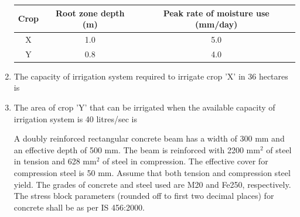 \documentclass[journal,12pt,onecolumn]{IEEEtran}
\theoremstyle{remark}
\begin{document}
\begin{enumerate}
\begin{table}[H]
\centering
\begin{tabular}{|c|c|c|}
\hline
Crop & Root zone depth (m) & Peak rate of moisture use (mm/day) \\
\hline
X & 1.0 & 5.0 \\
Y & 0.8 & 4.0 \\
\hline
\end{tabular}
\label{table5}
\end{table}
\noindent\item The capacity of irrigation system required to irrigate crop 'X' in 36 hectares is

\setlength{\parskip}{0.5cm}

\hfill{}
\begin{enumerate}
\end{enumerate}

\setlength{\parskip}{0.5cm}
\noindent\item The area of crop 'Y' that can be irrigated when the available capacity of irrigation system is 40 litres/sec is

\setlength{\parskip}{0.5cm}

\hfill{}
\begin{enumerate}
\end{enumerate}


A doubly reinforced rectangular concrete beam has a width of 300 mm and an effective depth of 500 mm. The beam is reinforced with 2200 mm\(^2\) of steel in tension and 628 mm\(^2\) of steel in compression. The effective cover for compression steel is 50 mm. Assume that both tension and compression steel yield. The grades of concrete and steel used are M20 and Fe250, respectively. The stress block parameters (rounded off to first two decimal places) for concrete shall be as per IS 456:2000.


\end{enumerate}
\end{document}
